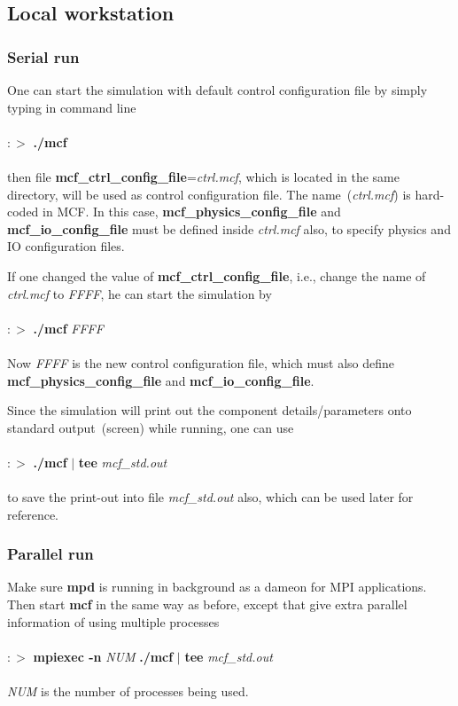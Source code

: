 \documentclass[a4paper,10pt]{article}
\begin{document}
\subsection{Local workstation}
\subsubsection{Serial run}
One can start the simulation 
with default control configuration file
by simply typing in command line \\ \\
$:>$ \textbf{./mcf }\\ \\
then file \textbf{mcf\_ctrl\_config\_file}=\textit{ctrl.mcf},
which is located in the same directory,
will be used as control configuration file.
The name~(\textit{ctrl.mcf}) is hard-coded in MCF.
In this case,
\textbf{mcf\_physics\_config\_file} and
\textbf{mcf\_io\_config\_file} must be defined
inside \textit{ctrl.mcf} also,
to specify physics and IO configuration files.

If one changed the value of \textbf{mcf\_ctrl\_config\_file},
i.e., change the name of \textit{ctrl.mcf} to \textit{FFFF}, 
he can start the simulation by \\ \\
$:>$ \textbf{./mcf } \textit{FFFF} \\ \\
Now \textit{FFFF} is the new control configuration file,
which must also define \\
\textbf{mcf\_physics\_config\_file} and
\textbf{mcf\_io\_config\_file}.

Since the simulation will print out 
the component details/parameters
onto standard output~(screen)
while running,
one can use \\ \\
$:>$ \textbf{./mcf } $\mid$ \textbf{tee} \textit{mcf\_std.out} \\ \\
to save the print-out into file \textit{mcf\_std.out} also,
which can be used later for reference.

\subsubsection{Parallel run}
Make sure {\bf mpd} is running in background as a dameon
for MPI applications.
Then start \textbf{mcf} in the same way as before,
except that give extra parallel information of using multiple processes\\ \\
$:>$ \textbf{mpiexec -n} \textit{NUM} \textbf{./mcf } $\mid$ \textbf{tee} \textit{mcf\_std.out}\\ \\
\textit{NUM} is the number of processes being used.
\end{document}
